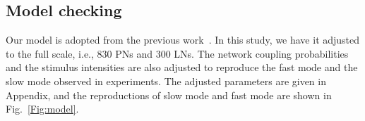 \documentclass[12pt, a4paper]{article}
\begin{document}

\subsection{Model checking} \label{Sect:model_checking}

Our model is adopted from the previous work~\citep{Patel2009, Patel2013}. In this study, we have it adjusted to the full scale, i.e., 830 PNs and 300 LNs. The network coupling probabilities and the stimulus intensities are also adjusted to reproduce the fast mode and the slow mode observed in experiments. The adjusted parameters are given in Appendix, and the reproductions of slow mode and fast mode are shown in Fig.~\ref{Fig:model}.
\end{document}
